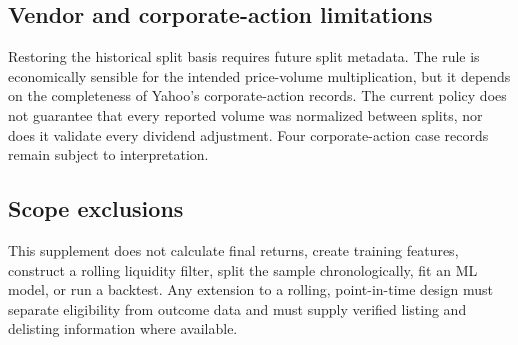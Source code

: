 \subsection{Vendor and corporate-action limitations}

Restoring the historical split basis requires future split metadata. The rule
is economically sensible for the intended price-volume multiplication, but it
depends on the completeness of Yahoo's corporate-action records. The current
policy does not guarantee that every reported volume was normalized between
splits, nor does it validate every dividend adjustment. Four corporate-action
case records remain subject to interpretation.

\subsection{Scope exclusions}

This supplement does not calculate final returns, create training features,
construct a rolling liquidity filter, split the sample chronologically, fit an
ML model, or run a backtest. Any extension to a rolling, point-in-time design
must separate eligibility from outcome data and must supply verified listing
and delisting information where available.
